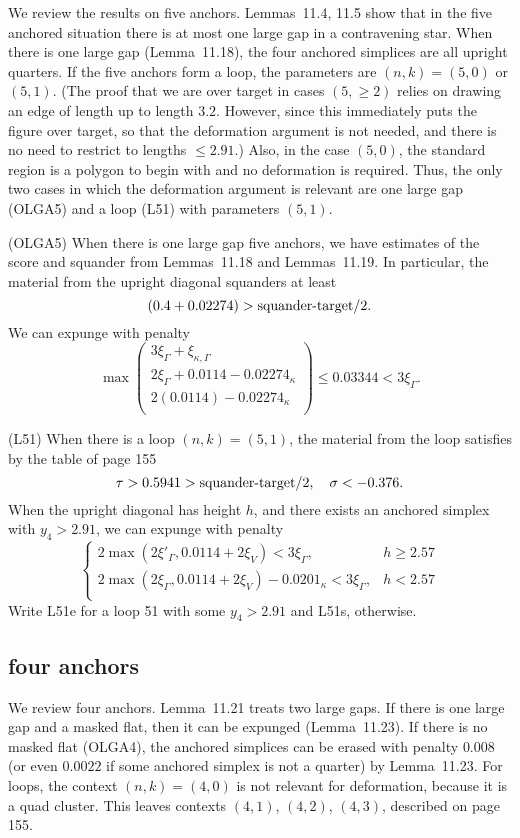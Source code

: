 \documentclass[11pt]{amsart}
\def\op#1{{\text{#1}}}
\def\text{\hbox}
\begin{document}
We review the results on five anchors. 
Lemmas~11.4, 11.5 show that in the five anchored situation there is at most one large gap in a contravening star.  When there is one large gap (Lemma~11.18), the four anchored simplices are all upright quarters. If the five anchors form a loop, the parameters are $(n,k)=(5,0)$ or $(5,1)$.  (The proof that we are over target in cases $(5,\ge2)$ relies on drawing an edge of length up to length $3.2$.  However, since this immediately puts the figure over target, so that the deformation argument is not needed, and there is no need to restrict to lengths $\le 2.91$.) Also, in the case $(5,0)$, the standard region is a polygon to begin with and no deformation is required.  Thus, the only two cases in which the deformation argument is relevant are one large gap (OLGA5) and a loop (L51) with parameters $(5,1)$.

(OLGA5) When there is one large gap five anchors, we have estimates of the score and squander
from Lemmas~11.18 and Lemmas~11.19.  In particular, the material from the upright diagonal squanders at least 
  $$(0.4 + 0.02274) > \op{squander-target}/2.$$  We can expunge with penalty
  $$\max \left(\begin{array}{lll}
  3\xi_\Gamma + \xi_{\kappa,\Gamma}\\
  2\xi_\Gamma + 0.0114 - 0.02274_\kappa\\
  2 (0.0114) - 0.02274_\kappa\\
  \end{array}
   \right)\le 0.03344 < 3\xi_\Gamma.$$
  
(L51) When there is a loop $(n,k)=(5,1)$, 
the material from the loop satisfies by the table
of page 155
  $$
  \tau > 0.5941 > \op{squander-target}/2,\quad \sigma < -0.376.
  $$
When the upright diagonal has height $h$, and there exists an anchored simplex
with $y_4 > 2.91$, we can expunge with penalty
  $$
  \begin{cases}
  2 \max(2\xi'_\Gamma,0.0114+2\xi_V) < 3\xi_\Gamma, & h \ge 2.57\\
  2 \max(2\xi_\Gamma,0.0114+2\xi_V) - 0.0201_\kappa < 3 \xi_\Gamma, & h < 2.57\\
  \end{cases}
  $$
Write L51e for a loop 51 with some $y_4 > 2.91$ and L51s, otherwise.

\subsection{four anchors}
We review four anchors.
Lemma~11.21 treats two large gaps.  If there is one large gap and a masked flat, then it can be expunged (Lemma~11.23).  If there
is no masked flat (OLGA4), 
the anchored simplices can be erased with penalty $0.008$ (or even $0.0022$ if some anchored simplex is not a quarter) by Lemma~11.23.  For loops, the context $(n,k)=(4,0)$
is not relevant for deformation, because it is a quad cluster.  This leaves contexts $(4,1)$, $(4,2)$, $(4,3)$, described on page 155. 
\end{document}
